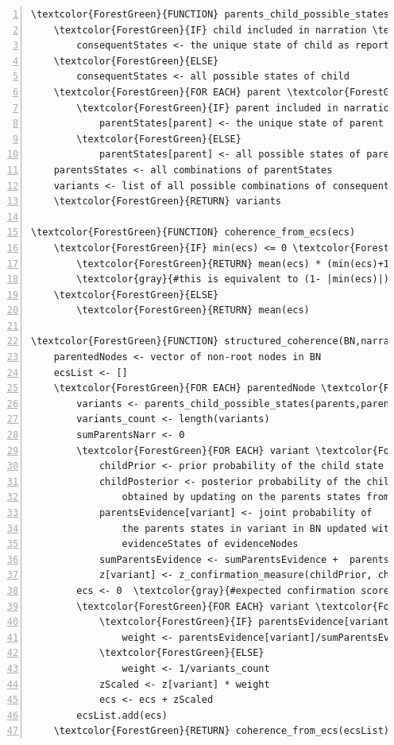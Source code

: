\documentclass[
  10pt,
]{scrartcl}
\begin{document}
\vspace{2mm}
\footnotesize
\begin{Verbatim}[commandchars=\\\{\},fontfamily=futura,numbers=left,
                 xleftmargin=20mm]
\textcolor{ForestGreen}{FUNCTION} parents_child_possible_states(parents,child,narration)
    \textcolor{ForestGreen}{IF} child included in narration \textcolor{ForestGreen}{THEN}
        consequentStates <- the unique state of child as reported in the narration
    \textcolor{ForestGreen}{ELSE}
        consequentStates <- all possible states of child
    \textcolor{ForestGreen}{FOR EACH} parent \textcolor{ForestGreen}{IN} parents
        \textcolor{ForestGreen}{IF} parent included in narration \textcolor{ForestGreen}{THEN}
            parentStates[parent] <- the unique state of parent as reported in the narration
        \textcolor{ForestGreen}{ELSE}
            parentStates[parent] <- all possible states of parent
    parentsStates <- all combinations of parentStates
    variants <- list of all possible combinations of consequentStates and parentsStates
    \textcolor{ForestGreen}{RETURN} variants

\textcolor{ForestGreen}{FUNCTION} coherence_from_ecs(ecs)
    \textcolor{ForestGreen}{IF} min(ecs) <= 0 \textcolor{ForestGreen}{THEN}
        \textcolor{ForestGreen}{RETURN} mean(ecs) * (min(ecs)+1) - min(ecs)min(ecs)
        \textcolor{gray}{#this is equivalent to (1- |min(ecs)|) * mean(ecs) + |min(ecs)| * min(ecs)}
    \textcolor{ForestGreen}{ELSE}
        \textcolor{ForestGreen}{RETURN} mean(ecs)

\textcolor{ForestGreen}{FUNCTION} structured_coherence(BN,narration,evidenceNodes,evidenceStates)
    parentedNodes <- vector of non-root nodes in BN
    ecsList <- []
    \textcolor{ForestGreen}{FOR EACH} parentedNode \textcolor{ForestGreen}{IN} parentedNodes
        variants <- parents_child_possible_states(parents,parentedNode, narration)
        variants_count <- length(variants)
        sumParentsNarr <- 0
        \textcolor{ForestGreen}{FOR EACH} variant \textcolor{ForestGreen}{IN} variants
            childPrior <- prior probability of the child state in variant
            childPosterior <- posterior probability of the child state in variant, 
                obtained by updating on the parents states from this variant
            parentsEvidence[variant] <- joint probability of 
                the parents states in variant in BN updated with
                evidenceStates of evidenceNodes
            sumParentsEvidence <- sumParentsEvidence +  parentsEvidence[variant] 
            z[variant] <- z_confirmation_measure(childPrior, childPosterior)
        ecs <- 0  \textcolor{gray}{#expected confirmation score}
        \textcolor{ForestGreen}{FOR EACH} variant \textcolor{ForestGreen}{IN} variants
            \textcolor{ForestGreen}{IF} parentsEvidence[variant] > 0 \textcolor{ForestGreen}{THEN}
                weight <- parentsEvidence[variant]/sumParentsEvidence
            \textcolor{ForestGreen}{ELSE}
                weight <- 1/variants_count
            zScaled <- z[variant] * weight
            ecs <- ecs + zScaled
        ecsList.add(ecs)
    \textcolor{ForestGreen}{RETURN} coherence_from_ecs(ecsList)
\end{Verbatim}
\normalsize
\end{document}
